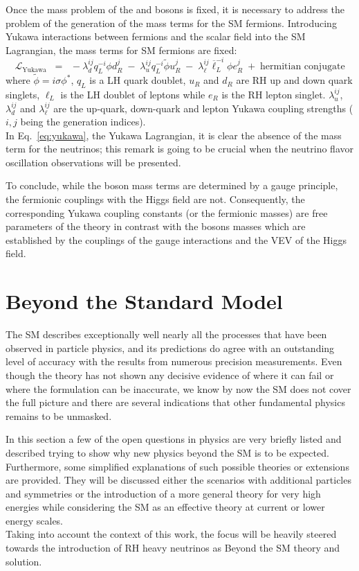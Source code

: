 Once the mass problem of the \PW and \PZ bosons is fixed, it is necessary to address the problem of the generation of the mass terms for the SM fermions. Introducing Yukawa interactions between fermions and the scalar field into the SM Lagrangian, the mass terms for SM fermions are fixed:
\begin{equation}
\label{eq:yukawa}
 \mathcal{L}_{\text{Yukawa}} \;\; = \;\; -\lambda^{ij}_dq^{-i}_L\phi d^j_R \;-\; \lambda^{ij}_uq^{-i}_L\tilde{\phi} u^j_R \;-\; \lambda^{ij}_{\ell}\overline{\ell}^{-i}_L\phi e^j_R \;+\; \text{hermitian conjugate}
\end{equation}
where $\tilde{\phi}= i\sigma\phi^*$, $q_L$ is a LH quark doublet, $u_R$ and $d_R$ are RH up and down quark singlets, $\ell_L$ is the LH doublet of leptons while $e_R$ is the RH lepton singlet. $\lambda^{ij}_u$, $\lambda^{ij}_d$ and $\lambda^{ij}_\ell$ are the up-quark, down-quark and lepton Yukawa coupling strengths ($i,j$ being the generation indices). \\
In Eq.~\ref{eq:yukawa}, the Yukawa Lagrangian, it is clear the absence of the mass term for the neutrinos; this remark is going to be crucial when the neutrino flavor oscillation observations will be presented.

To conclude, while the boson mass terms are determined by a gauge principle, the fermionic couplings with the Higgs field are not. Consequently, the corresponding Yukawa coupling constants (or the fermionic masses) are free parameters of the theory in contrast with the bosons masses which 
 are established by the couplings of the gauge interactions and the VEV of the Higgs field.



\section{Beyond the Standard Model}\label{sec:bsm}
The SM describes exceptionally well nearly all the processes that have been observed in particle physics, and its predictions do agree with an outstanding level of accuracy with the results from numerous precision measurements. Even though the theory has not shown any decisive evidence of where it can fail or where the formulation can be inaccurate, we know by now the SM does not cover the full picture and there are several indications that other fundamental physics remains to be unmasked.

In this section a few of the open questions in physics are very briefly listed and described trying to show why new physics beyond the SM is to be expected. Furthermore, some simplified explanations of such possible theories or extensions are provided. They will be discussed either the scenarios with additional particles and symmetries or the introduction of a more general theory for very high energies while considering the SM as an effective theory at current or lower energy scales.\\
Taking into account the context of this work, the focus will be heavily steered towards the introduction of RH heavy neutrinos as Beyond the SM theory and solution.



